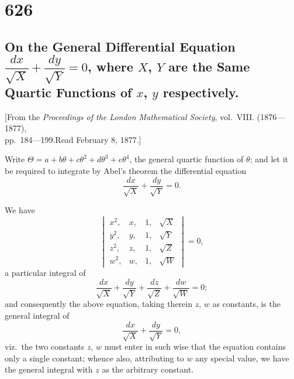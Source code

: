 \documentclass[11pt,a4paper]{book}
\begin{document}
\newpage

\section*{626}
\subsection*{On the General Differential Equation $\dfrac{dx}{\sqrt{X}} + \dfrac{dy}{\sqrt{Y}} = 0$, where $X$, $Y$ are the Same Quartic Functions of $x$, $y$ respectively.}

\begin{center}
\small
[From the \textit{Proceedings of the London Mathematical Society}, vol.~VIII. (1876---1877),\\
pp.~184---199.\quad Read February 8, 1877.]
\end{center}

\medskip
\noindent
Write $\Theta = a + b\theta + c\theta^2 + d\theta^3 + e\theta^4$, the general quartic function of $\theta$; and let it be required to integrate by Abel's theorem the differential equation
\[
\frac{dx}{\sqrt{X}} + \frac{dy}{\sqrt{Y}} = 0.
\]

We have
\[
\begin{vmatrix}
x^2, & x, & 1, & \surd X \\
y^2, & y, & 1, & \surd Y \\
z^2, & z, & 1, & \surd Z \\
w^2, & w, & 1, & \surd W
\end{vmatrix} = 0,
\]
a particular integral of
\[
\frac{dx}{\sqrt{X}} + \frac{dy}{\sqrt{Y}} + \frac{dz}{\sqrt{Z}} + \frac{dw}{\sqrt{W}} = 0;
\]
and consequently the above equation, taking therein $z$, $w$ as constants, is the general integral of
\[
\frac{dx}{\sqrt{X}} + \frac{dy}{\sqrt{Y}} = 0,
\]
viz.\ the two constants $z$, $w$ must enter in such wise that the equation contains only a single constant; whence also, attributing to $w$ any special value, we have the general integral with $z$ as the arbitrary constant.

\newpage
\end{document}
